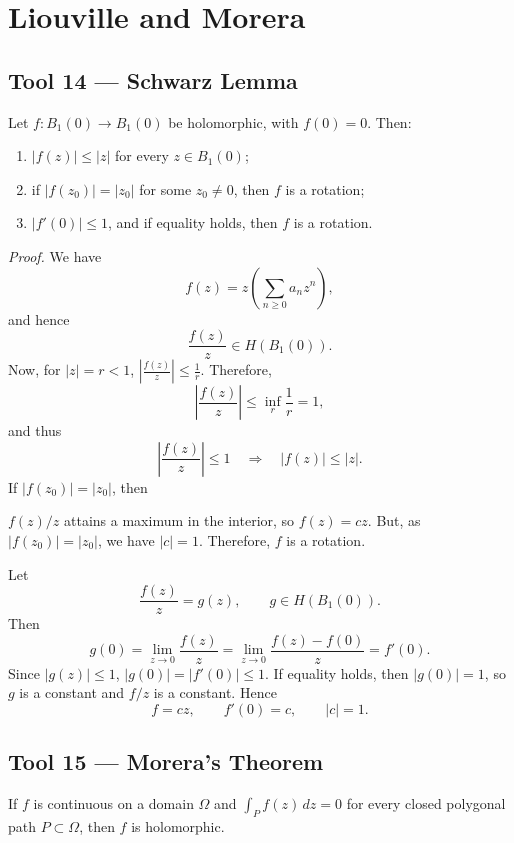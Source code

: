 \documentclass[11pt,a4paper]{article}
\begin{document}
\section*{Liouville and Morera}
\subsection*{Tool 14 — Schwarz Lemma}

Let \(f\colon B_1(0)\to B_1(0)\)
be holomorphic, with $f(0)=0$. Then:
\begin{enumerate}
  \item[(i)] $|f(z)|\leq |z|$ for every $z\in B_1(0)$;
  \item[(ii)] if $|f(z_0)|=|z_0|$ for some $z_0\ne0$, then $f$ is a rotation;
  \item[(iii)] $|f'(0)|\leq1$, and if equality holds, then $f$ is a rotation.
\end{enumerate}


\textit{Proof.}
We have
\[
  f(z)=z\left(\sum_{n\geq0}a_n z^n\right),
\]
and hence
\[
  \frac{f(z)}{z}\in H(B_1(0)).
\]
Now, for $|z|=r<1$, \(\left|\frac{f(z)}{z}\right|\leq\frac1r.\)
Therefore,
\[
  \left|\frac{f(z)}{z}\right|
  \leq\inf_r\frac1r=1,
\]
and thus
\[
  \left|\frac{f(z)}{z}\right|\leq1
  \quad\Longrightarrow\quad
  |f(z)|\leq|z|.
\]
If $|f(z_0)|=|z_0|$, then


$f(z)/z$ attains a maximum in the interior, so $f(z)=cz$. But, as
$|f(z_0)|=|z_0|$, we have $|c|=1$. Therefore, $f$ is a rotation.

Let
\[
  \frac{f(z)}{z}=g(z),
  \qquad g\in H(B_1(0)).
\]
Then
\[
  g(0)=\lim_{z\to0}\frac{f(z)}{z}
      =\lim_{z\to0}\frac{f(z)-f(0)}{z}
      =f'(0).
\]
Since $|g(z)|\leq1$, \(|g(0)|=|f'(0)|\leq1.\)
If equality holds, then $|g(0)|=1$, so $g$ is a constant and $f/z$ is a
constant. Hence
\[
  f=cz,
  \qquad f'(0)=c,
  \qquad |c|=1.
\]

\subsection*{Tool 15 — Morera's Theorem}
If $f$ is continuous on a domain $\Omega$ and $\int_P f(z)\,dz=0$ for every closed polygonal path $P\subset\Omega$, then $f$ is holomorphic.
\end{document}
